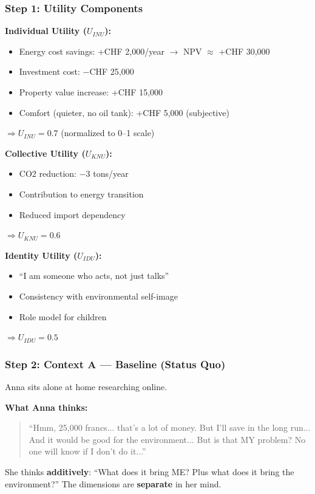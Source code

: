 \subsubsection{Step 1: Utility Components}

\textbf{Individual Utility ($U_{INU}$):}
\begin{itemize}
\item Energy cost savings: +CHF 2,000/year $\rightarrow$ NPV $\approx$ +CHF 30,000
\item Investment cost: $-$CHF 25,000
\item Property value increase: +CHF 15,000
\item Comfort (quieter, no oil tank): +CHF 5,000 (subjective)
\end{itemize}
$\Rightarrow U_{INU} = 0.7$ (normalized to 0--1 scale)

\textbf{Collective Utility ($U_{KNU}$):}
\begin{itemize}
\item CO2 reduction: $-$3 tons/year
\item Contribution to energy transition
\item Reduced import dependency
\end{itemize}
$\Rightarrow U_{KNU} = 0.6$

\textbf{Identity Utility ($U_{IDU}$):}
\begin{itemize}
\item ``I am someone who acts, not just talks''
\item Consistency with environmental self-image
\item Role model for children
\end{itemize}
$\Rightarrow U_{IDU} = 0.5$

\subsubsection{Step 2: Context A --- Baseline (Status Quo)}

Anna sits alone at home researching online.

\textbf{What Anna thinks:}
\begin{quote}
``Hmm, 25,000 francs... that's a lot of money. But I'll save in the long run... And it would be good for the environment... But is that MY problem? No one will know if I don't do it...''
\end{quote}

She thinks \textbf{additively}: ``What does it bring ME? Plus what does it bring the environment?'' The dimensions are \textbf{separate} in her mind.

